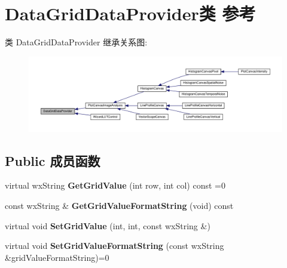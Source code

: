 \hypertarget{class_data_grid_data_provider}{\section{Data\+Grid\+Data\+Provider类 参考}
\label{class_data_grid_data_provider}
}


类 Data\+Grid\+Data\+Provider 继承关系图\+:
\nopagebreak
\begin{figure}[H]
\begin{center}
\leavevmode
\includegraphics[width=350pt]{class_data_grid_data_provider__inherit__graph}
\end{center}
\end{figure}
\subsection*{Public 成员函数}
\begin{DoxyCompactItemize}
\item 
\hypertarget{class_data_grid_data_provider_a7847274fc7041dbdb98040a782720dcc}{virtual wx\+String {\bfseries Get\+Grid\+Value} (int row, int col) const =0}\label{class_data_grid_data_provider_a7847274fc7041dbdb98040a782720dcc}

\item 
\hypertarget{class_data_grid_data_provider_a85523631b2bbac7684d329e6c938770e}{const wx\+String \& {\bfseries Get\+Grid\+Value\+Format\+String} (void) const }\label{class_data_grid_data_provider_a85523631b2bbac7684d329e6c938770e}

\item 
\hypertarget{class_data_grid_data_provider_ad50afaeca3ba2a6b9914f2b4bebc463a}{virtual void {\bfseries Set\+Grid\+Value} (int, int, const wx\+String \&)}\label{class_data_grid_data_provider_ad50afaeca3ba2a6b9914f2b4bebc463a}

\item 
\hypertarget{class_data_grid_data_provider_a400758ef5be48534e8c46e0c624b03fa}{virtual void {\bfseries Set\+Grid\+Value\+Format\+String} (const wx\+String \&grid\+Value\+Format\+String)=0}\label{class_data_grid_data_provider_a400758ef5be48534e8c46e0c624b03fa}

\end{DoxyCompactItemize}
